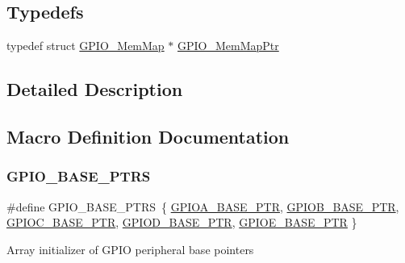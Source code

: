 \subsection*{Typedefs}
\begin{DoxyCompactItemize}
\item 
typedef struct \hyperlink{struct_g_p_i_o___mem_map}{G\+P\+I\+O\+\_\+\+Mem\+Map} $\ast$ \hyperlink{group___g_p_i_o___peripheral_ga31c1eddda45aa085f51142987e05ada5}{G\+P\+I\+O\+\_\+\+Mem\+Map\+Ptr}
\end{DoxyCompactItemize}


\subsection{Detailed Description}


\subsection{Macro Definition Documentation}
\mbox{\label{group___g_p_i_o___peripheral_gad0f7206167a584b1e75a81a5c30fa1c2}} 
\subsubsection{\texorpdfstring{G\+P\+I\+O\+\_\+\+B\+A\+S\+E\+\_\+\+P\+T\+RS}{GPIO\_BASE\_PTRS}}
{\footnotesize\ttfamily \#define G\+P\+I\+O\+\_\+\+B\+A\+S\+E\+\_\+\+P\+T\+RS~\{ \hyperlink{group___g_p_i_o___peripheral_ga3a8bd75d8b47b51132005ce9bbcbab7f}{G\+P\+I\+O\+A\+\_\+\+B\+A\+S\+E\+\_\+\+P\+TR}, \hyperlink{group___g_p_i_o___peripheral_ga3f4701cf222c28bfdcc2768a296b4171}{G\+P\+I\+O\+B\+\_\+\+B\+A\+S\+E\+\_\+\+P\+TR}, \hyperlink{group___g_p_i_o___peripheral_ga39b26484b0ad91fdbf93e27aa6ee7571}{G\+P\+I\+O\+C\+\_\+\+B\+A\+S\+E\+\_\+\+P\+TR}, \hyperlink{group___g_p_i_o___peripheral_ga080871bcecac6697912c87d4af0a8298}{G\+P\+I\+O\+D\+\_\+\+B\+A\+S\+E\+\_\+\+P\+TR}, \hyperlink{group___g_p_i_o___peripheral_ga5d17758f0829d938753761d4a53c0a7c}{G\+P\+I\+O\+E\+\_\+\+B\+A\+S\+E\+\_\+\+P\+TR} \}}

Array initializer of G\+P\+IO peripheral base pointers \mbox{\label{group___g_p_i_o___peripheral_ga3a8bd75d8b47b51132005ce9bbcbab7f}} 
